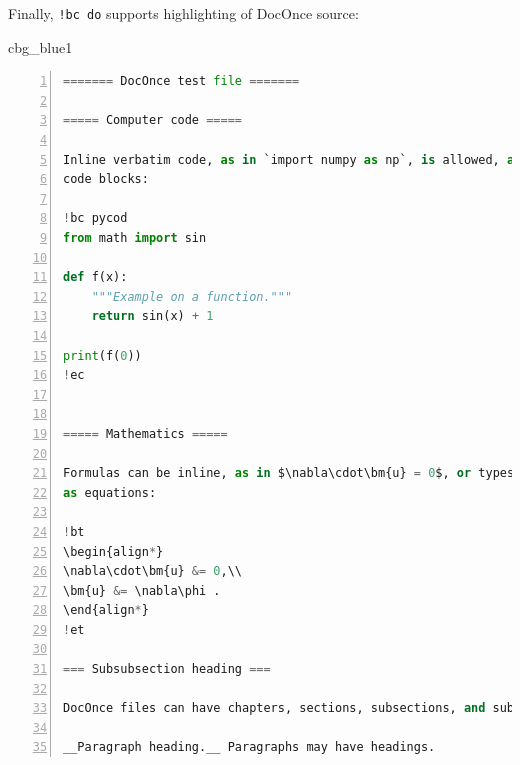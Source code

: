 \documentclass[%
oneside,                 %
final,                   %
10pt]{article}
\newenvironment{_cod_tight}[1]{
   \def\FrameCommand{\colorbox{#1}}
   \FrameRule0.6pt\MakeFramed {\FrameRestore}\vskip3mm}
   {\vskip0mm\endMakeFramed}
\newenvironment{cod}[1]{
\bgroup\rmfamily
\fboxsep=0mm\relax
\begin{_cod_tight}{#1}
\list{}{\parsep=-2mm\parskip=0mm\topsep=0pt\leftmargin=2mm
\rightmargin=2\leftmargin\leftmargin=4pt\relax}
\item\relax}
{\endlist\end{_cod_tight}\egroup}
\theoremstyle{definition}
\begin{document}
Finally, \Verb?!bc do? supports highlighting of DocOnce source:
\begin{cod}{cbg_blue1}\begin{lstlisting}[language=Python,style=myspeciallststyle,numbers=left,numberstyle=\tiny,stepnumber=3,numbersep=15pt,xleftmargin=1mm]
======= DocOnce test file =======

===== Computer code =====

Inline verbatim code, as in `import numpy as np`, is allowed, as well as
code blocks:

!bc pycod
from math import sin

def f(x):
    """Example on a function."""
    return sin(x) + 1

print(f(0))
!ec


===== Mathematics =====

Formulas can be inline, as in $\nabla\cdot\bm{u} = 0$, or typeset
as equations:

!bt
\begin{align*}
\nabla\cdot\bm{u} &= 0,\\ 
\bm{u} &= \nabla\phi .
\end{align*}
!et

=== Subsubsection heading ===

DocOnce files can have chapters, sections, subsections, and subsubsections.

__Paragraph heading.__ Paragraphs may have headings.

\end{lstlisting}\end{cod}
\noindent
\end{document}
